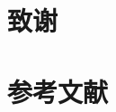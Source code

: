 \documentclass[final,5p]{elsarticlezh}
\begin{document}

\section*{致谢} \label{acknowledgements}




\section*{参考文献} \label{references}


\end{document}
